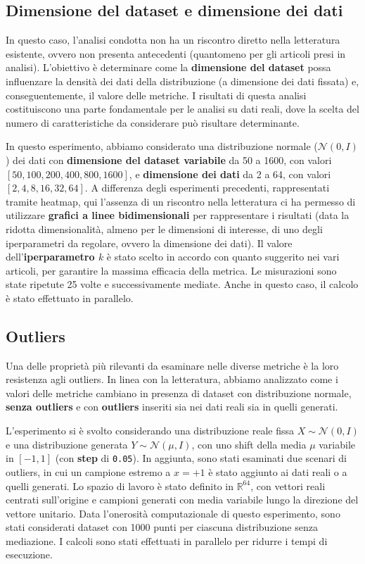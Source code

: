 \subsection{Dimensione del dataset e dimensione dei dati}
\label{subsec:dataset-data-dimension}

In questo caso, l'analisi condotta non ha un riscontro diretto nella letteratura esistente, ovvero non presenta antecedenti (quantomeno per gli articoli presi in analisi). L'obiettivo è determinare come la \textbf{dimensione del dataset} possa influenzare la densità dei dati della distribuzione (a dimensione dei dati fissata) e, conseguentemente, il valore delle metriche. I risultati di questa analisi costituiscono una parte fondamentale per le analisi su dati reali, dove la scelta del numero di caratteristiche da considerare può risultare determinante.

In questo esperimento, abbiamo considerato una distribuzione normale (\(\mathcal{N}(0, I)\)) dei dati con \textbf{dimensione del dataset variabile} da 50 a 1600, con valori \([50, 100, 200, 400, 800, 1600]\), e \textbf{dimensione dei dati} da 2 a 64, con valori \([2, 4, 8, 16, 32, 64]\). 
A differenza degli esperimenti precedenti, rappresentati tramite heatmap, qui l'assenza di un riscontro nella letteratura ci ha permesso di utilizzare \textbf{grafici a linee bidimensionali} per rappresentare i risultati (data la ridotta dimensionalità, almeno per le dimensioni di interesse, di uno degli iperparametri da regolare, ovvero la dimensione dei dati).
Il valore dell'\textbf{iperparametro \( k \)} è stato scelto in accordo con quanto suggerito nei vari articoli, per garantire la massima efficacia della metrica. Le misurazioni sono state ripetute 25 volte e successivamente mediate. Anche in questo caso, il calcolo è stato effettuato in parallelo.

\subsection{Outliers}
\label{subsec:outliers}

Una delle proprietà più rilevanti da esaminare nelle diverse metriche è la loro resistenza agli outliers. In linea con la letteratura, abbiamo analizzato come i valori delle metriche cambiano in presenza di dataset con distribuzione normale, \textbf{senza outliers} e con \textbf{outliers} inseriti sia nei dati reali sia in quelli generati.

L’esperimento si è svolto considerando una distribuzione reale fissa \( X \sim \mathcal{N}(0, I) \) e una distribuzione generata \( Y \sim \mathcal{N}(\mu, I) \), con uno shift della media \(\mu\) variabile in \([-1,1]\) (con \textbf{step} di \texttt{0.05}). In aggiunta, sono stati esaminati due scenari di outliers, in cui un campione estremo a \( x = +1 \) è stato aggiunto ai dati reali o a quelli generati. 
Lo spazio di lavoro è stato definito in \( \mathbb{R}^{64} \), con vettori reali centrati sull’origine e campioni generati con media variabile lungo la direzione del vettore unitario.
Data l'onerosità computazionale di questo esperimento, sono stati considerati dataset con 1000 punti per ciascuna distribuzione senza mediazione. I calcoli sono stati effettuati in parallelo per ridurre i tempi di esecuzione.

